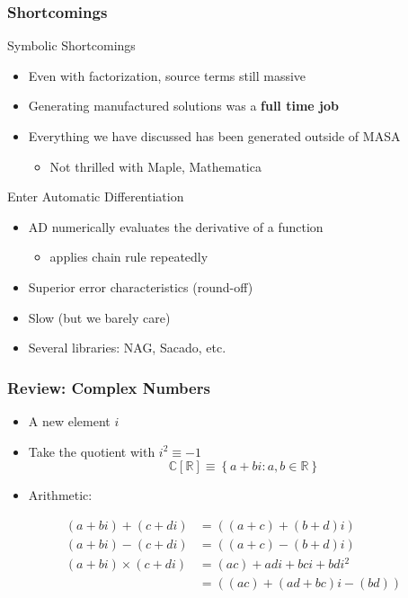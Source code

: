\documentclass[mathserif]{beamer}
\newcommand{\Reals}{{\ensuremath{\mathbb{R}}}}
\newcommand{\Complex}{{\ensuremath{\mathbb{C}}}}
\begin{document}
\begin{frame}
\frametitle{Shortcomings}

\begin{block}{Symbolic Shortcomings}
 \begin{itemize}
  \item Even with factorization, source terms still massive
  \item Generating manufactured solutions was a {\bf full time job}
  \item Everything we have discussed has been generated outside of MASA
	\begin{itemize}
	 \item Not thrilled with Maple, Mathematica
	\end{itemize}
 \end{itemize}
\end{block}

 \begin{block}{Enter Automatic Differentiation}
  \begin{itemize}
   \item AD numerically evaluates the derivative of a function 
	\begin{itemize}
	 \item applies chain rule repeatedly 
	\end{itemize}
   \item Superior error characteristics (round-off)
   \item Slow (but we barely care)
   \item Several libraries: NAG, Sacado, etc.
  \end{itemize}
 \end{block}
\end{frame}

\begin{frame}
\frametitle{Review: Complex Numbers}

\begin{itemize}
\item A new element $i$

\item Take the quotient with $i^2 \equiv -1$
\[\Complex[\Reals] \equiv \left\{a + b i: a,b \in \Reals\right\}\]
\item Arithmetic:
\end{itemize}
\begin{align*}
(a+b i) + (c+d i) &= ((a+c) + (b+d) i) \\
(a+b i) - (c+d i) &= ((a+c) - (b+d) i) \\
(a+b i) \times (c+d i) &= (ac) + ad i + bc i + bd i^2 \\
                              &= ((ac) + (ad+bc)i - (bd))
\end{align*}
\end{frame}
\end{document}
